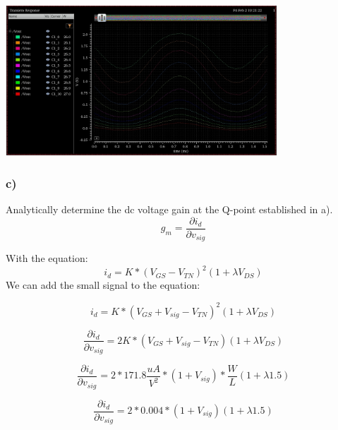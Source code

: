 \documentclass[10pt,a4paper]{article}
\begin{document}
\includegraphics[width=4in]{images/Problem4design2.png} \\


\subsubsection*{c)}
Analytically determine the dc voltage gain at the Q-point established in a).\\

\begin{equation}
g_m = \frac{\partial i_{d}}{\partial v_{sig}}
\end{equation}

With the equation:
\begin{equation}
i_{d} = K * (V_{GS} - V_{TN})^2(1+\lambda V_{DS})
\end{equation}
We can add the small signal to the equation:

\begin{equation}
i_{d} = K * (V_{GS} + V_{sig} - V_{TN})^2(1+\lambda V_{DS})
\end{equation}

\begin{equation}
\frac{\partial i_{d}}{\partial v_{sig}} = 2K * (V_{GS} + V_{sig} - V_{TN}) (1+\lambda V_{DS})
\end{equation}

\begin{equation}
\frac{\partial i_{d}}{\partial v_{sig}} = 2 * 171.8 \frac{uA}{V^2} * (1 + V_{sig}) * \frac{W}{L}(1+\lambda 1.5)
\end{equation}

\begin{equation}
\frac{\partial i_{d}}{\partial v_{sig}} = 2 * 0.004 * (1 + V_{sig})(1+\lambda 1.5)
\end{equation}
\end{document}
